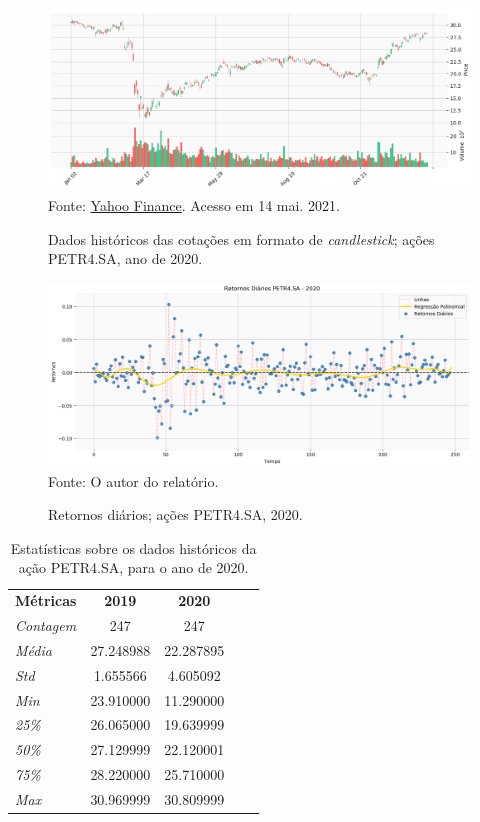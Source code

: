 \begin{figure}[H]
\centering
\caption{Dados históricos das cotações em formato de \textit{candlestick}; ações PETR4.SA, ano de 2020.}
  \includegraphics[scale=0.55]{figures/img4.png}
  Fonte: \href{https://finance.yahoo.com/}{Yahoo Finance}. Acesso em 14 mai. 2021.
\end{figure}


\begin{figure}[H]
\centering
\caption{Retornos diários; ações PETR4.SA, 2020.}
  \includegraphics[scale=0.52]{figures/img5.png}
  Fonte: O autor do relatório.
\end{figure}


\begin{table}[H]
\footnotesize
\centering
\caption{Estatísticas sobre os dados históricos da ação PETR4.SA, para o ano de 2020.}
\begin{tabular}{lccll}
\cline{1-3}
\multicolumn{1}{c}{\textbf{Métricas}} & \textbf{2019} & \textbf{2020} &  &  \\ \cline{1-3}
\textit{Contagem} & 247 & 247 &  &  \\
\textit{Média} & 27.248988 & 22.287895 &  &  \\
\textit{Std} & 1.655566 & 4.605092 &  &  \\
\textit{Min} & 23.910000 & 11.290000 &  &  \\
\textit{25\%} & 26.065000 & 19.639999 &  &  \\
\textit{50\%} & 27.129999 & 22.120001 &  &  \\
\textit{75\%} & 28.220000 & 25.710000 &  &  \\
\textit{Max} & \multicolumn{1}{l}{30.969999} & \multicolumn{1}{l}{30.809999} &  &  \\ \cline{1-3}
\end{tabular}
\end{table}


